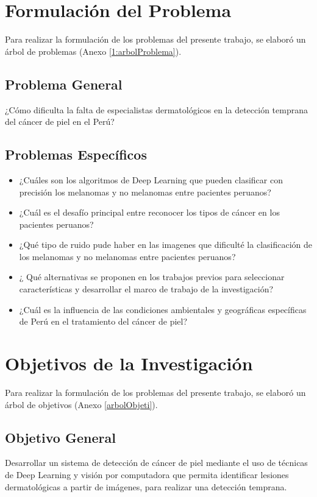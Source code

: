\section{Formulación del Problema}

Para realizar la formulación de los problemas del presente trabajo, se elaboró un árbol de problemas (Anexo \ref{1:arbolProblema}).

\subsection{Problema General}
\newcommand{\ProblemaGeneral}{¿Cómo dificulta la falta de especialistas dermatológicos en la detección temprana del cáncer de piel en el Perú?
}
\ProblemaGeneral
\subsection{Problemas Espec\'{i}ficos}
\newcommand{\Pbone}{
¿Cuáles son los algoritmos de Deep Learning que pueden clasificar con precisión los melanomas y no melanomas entre pacientes peruanos?
}
\newcommand{\Pbtwo}{
¿Cuál es el desafío principal entre reconocer los tipos de cáncer en los pacientes peruanos?
}
\newcommand{\Pbthree}{
¿Qué tipo de ruido pude haber en las imagenes que dificulté la clasificación de los melanomas y no melanomas entre pacientes peruanos?
}
\newcommand{\Pbfour}{
¿ Qué alternativas se proponen en los trabajos previos para seleccionar características y desarrollar el marco de trabajo de la investigación?
}
\newcommand{\Pbfive}{
¿Cuál es la influencia de las condiciones ambientales y geográficas específicas de Perú en el tratamiento del cáncer de piel?
}

\begin{itemize}
	\item \Pbone
	\item \Pbtwo
	\item \Pbthree
	\item \Pbfour
	\item \Pbfive
\end{itemize}

\section{Objetivos de la Investigación}

Para realizar la formulación de los problemas del presente trabajo, se elaboró un árbol de objetivos (Anexo \ref{arbolObjeti}).


\subsection{Objetivo General}
\newcommand{\ObjetivoGeneral}{
Desarrollar un sistema de detección de cáncer de piel mediante el uso de técnicas de Deep Learning y visión por computadora que permita identificar lesiones dermatológicas a partir de imágenes, para realizar una detección temprana.


}
\ObjetivoGeneral

